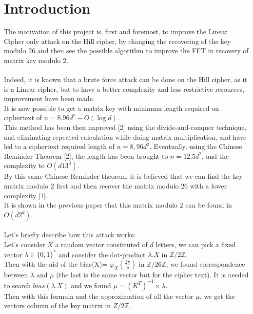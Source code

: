 \documentclass{article}
\begin{document}

\section{Introduction}
The motivation of this project is, first and foremost, to improve the Linear Cipher only attack on the Hill cipher, by changing the recovering of the key modulo 26 and then see the possible algorithm to improve the FFT in recovery of matrix key modulo 2.\\
\\
Indeed, it is known that a brute force attack can be done on the Hill cipher, as it is a Linear cipher, but to have a better complexity and less restrictive resources, improvement have been made.\\
It is now possible to get a matrix key with minimum length required on ciphertext of $n =8.96d^2 -O(\log d)$.\\
This method has been then improved [2] using the divide-and-conquer technique, and eliminating repeated calculation while doing matrix multiplication, and have led to a ciphertext required length of $n=8,96d^2$. Eventually, using the Chinese Reminder Theorem [2], the length has been brought to $n=12.5d^2$, and the complexity to $O(d13^d)$.\\
By this same Chinese Reminder theorem, it is believed that we can find the key matrix modulo 2 first and then recover the matrix modulo 26 with a lower complexity [1].\\
It is shown in the previous paper that this matrix modulo 2 can be found in $O(d2^d)$.\\
\\
Let's briefly describe how this attack works:\\
Let's consider $X$ a random vector constituted of $d$ letters, we can pick a fixed vector $\lambda \in \{0,1\}^*$ and consider the dot-product $\lambda . X$ in $\mathbb{Z}/2\mathbb{Z}$.\\
Then with the aid of the bias(X)= $\varphi_{X}(\frac{2\pi}{p})$ in $\mathbb{Z}/26\mathbb{Z}$, we found correspondence between $\lambda$ and $\mu$ (the last is the same vector but for the cipher text). It is needed to search $bias(\lambda . X)$ and we found $ \mu = (K^T)^{-1} \times\lambda $.\\
Then with this formula and the approximation of all the vector $\mu$, we get the vectors column of the key matrix in ${Z}/2\mathbb{Z}$.\\
\end{document}
